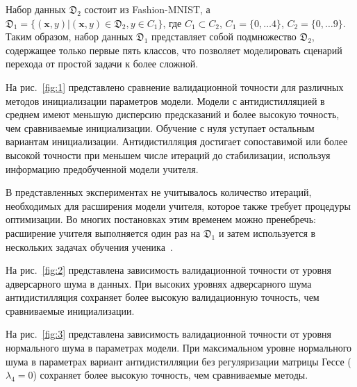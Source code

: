 Набор данных $\mathfrak{D}_2$ состоит из Fashion-MNIST, а $\mathfrak{D}_1 = \{(\textbf{x}, y) | (\textbf{x}, y) \in \mathfrak{D}_2, y \in C_1\}$, где $C_1 \subset C_2$, $C_1 = \{0, \dots 4\}$, $C_2 = \{0, \dots 9\}$. Таким образом, набор данных $\mathfrak{D}_1$ представляет собой подмножество $\mathfrak{D}_2$, содержащее только первые пять классов, что позволяет моделировать сценарий перехода от простой задачи к более сложной.

На рис.~\ref{fig:1} представлено сравнение валидационной точности для различных методов инициализации параметров модели. Модели с антидистилляцией в среднем имеют меньшую дисперсию предсказаний и более высокую точность, чем сравниваемые инициализации. Обучение с нуля уступает остальным вариантам инициализации. Антидистилляция достигает сопоставимой или более высокой точности при меньшем числе итераций до стабилизации, используя информацию предобученной модели учителя.

В представленных экспериментах не учитывалось количество итераций, необходимых для расширения модели учителя, которое также требует процедуры оптимизации. Во многих постановках этим временем можно пренебречь: расширение учителя выполняется один раз на $\mathfrak{D}_1$ и затем используется в нескольких задачах обучения ученика~\cite{sun2019meta}.

На рис.~\ref{fig:2} представлена зависимость валидационной точности от уровня адверсарного шума в данных. При высоких уровнях адверсарного шума антидистилляция сохраняет более высокую валидационную точность, чем сравниваемые инициализации.

На рис.~\ref{fig:3} представлена зависимость валидационной точности от уровня нормального шума в параметрах модели. При максимальном уровне нормального шума в параметрах вариант антидистилляции без регуляризации матрицы Гессе ($\lambda_4=0$) сохраняет более высокую точность, чем сравниваемые методы.

